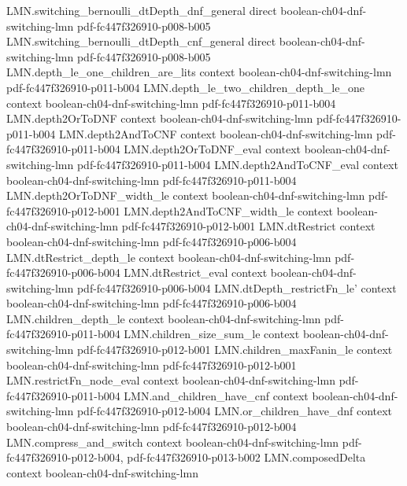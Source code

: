 \begin{theorem}
  {LMN.switching_bernoulli_dtDepth_dnf_general}
  {direct}
  {boolean-ch04-dnf-switching-lmn}
  {pdf-fc447f326910-p008-b005}
\proofstep
  {LMN.switching_bernoulli_dtDepth_cnf_general}
  {direct}
  {boolean-ch04-dnf-switching-lmn}
  {pdf-fc447f326910-p008-b005}
\proofstep
  {LMN.depth_le_one_children_are_lits}
  {context}
  {boolean-ch04-dnf-switching-lmn}
  {pdf-fc447f326910-p011-b004}
\proofstep
  {LMN.depth_le_two_children_depth_le_one}
  {context}
  {boolean-ch04-dnf-switching-lmn}
  {pdf-fc447f326910-p011-b004}
\proofstep
  {LMN.depth2OrToDNF}
  {context}
  {boolean-ch04-dnf-switching-lmn}
  {pdf-fc447f326910-p011-b004}
\proofstep
  {LMN.depth2AndToCNF}
  {context}
  {boolean-ch04-dnf-switching-lmn}
  {pdf-fc447f326910-p011-b004}
\proofstep
  {LMN.depth2OrToDNF_eval}
  {context}
  {boolean-ch04-dnf-switching-lmn}
  {pdf-fc447f326910-p011-b004}
\proofstep
  {LMN.depth2AndToCNF_eval}
  {context}
  {boolean-ch04-dnf-switching-lmn}
  {pdf-fc447f326910-p011-b004}
\proofstep
  {LMN.depth2OrToDNF_width_le}
  {context}
  {boolean-ch04-dnf-switching-lmn}
  {pdf-fc447f326910-p012-b001}
\proofstep
  {LMN.depth2AndToCNF_width_le}
  {context}
  {boolean-ch04-dnf-switching-lmn}
  {pdf-fc447f326910-p012-b001}
\proofstep
  {LMN.dtRestrict}
  {context}
  {boolean-ch04-dnf-switching-lmn}
  {pdf-fc447f326910-p006-b004}
\proofstep
  {LMN.dtRestrict_depth_le}
  {context}
  {boolean-ch04-dnf-switching-lmn}
  {pdf-fc447f326910-p006-b004}
\proofstep
  {LMN.dtRestrict_eval}
  {context}
  {boolean-ch04-dnf-switching-lmn}
  {pdf-fc447f326910-p006-b004}
\proofstep
  {LMN.dtDepth_restrictFn_le'}
  {context}
  {boolean-ch04-dnf-switching-lmn}
  {pdf-fc447f326910-p006-b004}
\proofstep
  {LMN.children_depth_le}
  {context}
  {boolean-ch04-dnf-switching-lmn}
  {pdf-fc447f326910-p011-b004}
\proofstep
  {LMN.children_size_sum_le}
  {context}
  {boolean-ch04-dnf-switching-lmn}
  {pdf-fc447f326910-p012-b001}
\proofstep
  {LMN.children_maxFanin_le}
  {context}
  {boolean-ch04-dnf-switching-lmn}
  {pdf-fc447f326910-p012-b001}
\proofstep
  {LMN.restrictFn_node_eval}
  {context}
  {boolean-ch04-dnf-switching-lmn}
  {pdf-fc447f326910-p011-b004}
\proofstep
  {LMN.and_children_have_cnf}
  {context}
  {boolean-ch04-dnf-switching-lmn}
  {pdf-fc447f326910-p012-b004}
\proofstep
  {LMN.or_children_have_dnf}
  {context}
  {boolean-ch04-dnf-switching-lmn}
  {pdf-fc447f326910-p012-b004}
\proofstep
  {LMN.compress_and_switch}
  {context}
  {boolean-ch04-dnf-switching-lmn}
  {pdf-fc447f326910-p012-b004,
    pdf-fc447f326910-p013-b002}
\proofstep
  {LMN.composedDelta}
  {context}
  {boolean-ch04-dnf-switching-lmn}

\end{theorem}
